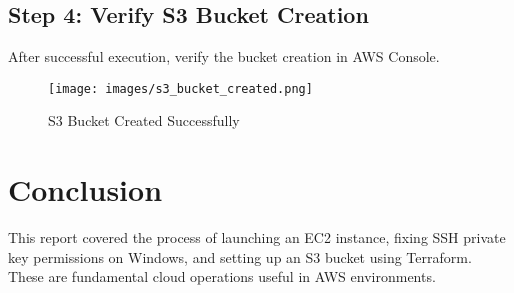 \documentclass{article}
\begin{document}
\newpage

\subsection{Step 4: Verify S3 Bucket Creation}

After successful execution, verify the bucket creation in AWS Console.

\begin{figure}[H]
  \centering
  \texttt{[image: images/s3\_bucket\_created.png]}
  \caption{S3 Bucket Created Successfully}
  \label{fig:s3_bucket}
\end{figure}

\section{Conclusion}
This report covered the process of launching an EC2 instance, fixing SSH private key permissions on Windows, and setting up an S3 bucket using Terraform. These are fundamental cloud operations useful in AWS environments.
\end{document}
